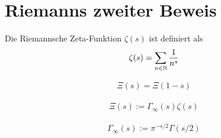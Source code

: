 \section{Riemanns zweiter Beweis}
\label{sec:riemann2}

\begin{defi}
	\label{def:zeta}
	Die Riemannsche Zeta-Funktion $\zeta(s)$  ist definiert als
	\begin{align}
		\zeta (s) = \sum_{n\in \mathbb{N}} \frac{1}{n^s}
	\end{align}
\end{defi}

\begin{satz}
	\label{form:funktionalgleichung}
	\begin{align}
		 \Xi(s) = \Xi(1-s)
	\end{align}
\end{satz}


\begin{defi}
	\label{def:xi}
	\begin{align}
		\Xi(s) := \Gamma_\infty(s) \zeta(s)
	\end{align}
\end{defi}

\begin{defi}
	\label{def:gamma_infty}
	\begin{align}
		\Gamma_\infty(s) := \pi^{-s/2} \Gamma(s/2)
	\end{align}
\end{defi}